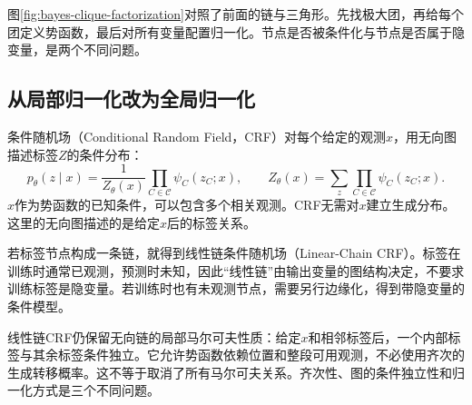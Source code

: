 图\ref{fig:bayes-clique-factorization}对照了前面的链与三角形。先找极大团，再给每个团定义势函数，最后对所有变量配置归一化。节点是否被条件化与节点是否属于隐变量，是两个不同问题。

\subsection{从局部归一化改为全局归一化}
条件随机场（Conditional Random Field，CRF）对每个给定的观测$x$，用无向图描述标签$Z$的条件分布\cite{lafferty2001crf}：
\begin{equation}
 p_\theta(z\mid x)=\frac{1}{Z_\theta(x)}
 \prod_{C\in\mathcal C}\psi_C(z_C;x),\qquad
 Z_\theta(x)=\sum_z\prod_{C\in\mathcal C}\psi_C(z_C;x).
\end{equation}
$x$作为势函数的已知条件，可以包含多个相关观测。CRF无需对$x$建立生成分布。这里的无向图描述的是给定$x$后的标签关系。

若标签节点构成一条链，就得到线性链条件随机场（Linear-Chain CRF）。标签在训练时通常已观测，预测时未知，因此“线性链”由输出变量的图结构决定，不要求训练标签是隐变量。若训练时也有未观测节点，需要另行边缘化，得到带隐变量的条件模型。

线性链CRF仍保留无向链的局部马尔可夫性质：给定$x$和相邻标签后，一个内部标签与其余标签条件独立。它允许势函数依赖位置和整段可用观测，不必使用齐次的生成转移概率。这不等于取消了所有马尔可夫关系。齐次性、图的条件独立性和归一化方式是三个不同问题。

